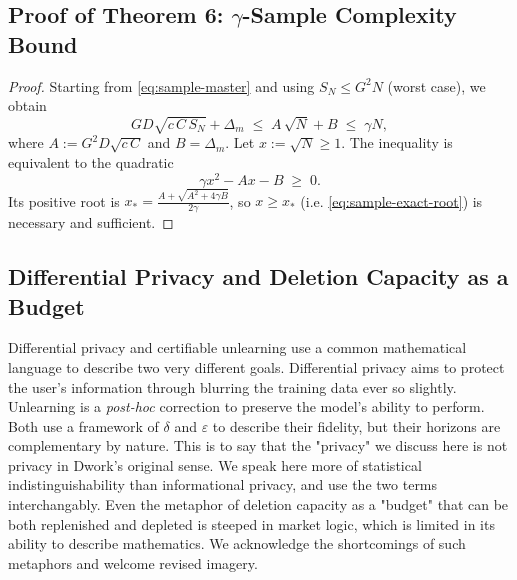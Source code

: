 \documentclass{article}
\theoremstyle{ssltheorem}
\begin{document}
\subsection{Proof of Theorem 6: $\gamma$-Sample Complexity Bound}
\begin{proof}
Starting from \eqref{eq:sample-master} and using $S_{N}\le G^{2}N$ (worst case), we obtain
$$
GD\sqrt{c\,C\,S_{N}}+\Delta_m
\;\le\;
A\,\sqrt{N}+B
\;\le\;\gamma N,
$$
where $A:=G^{2}D\sqrt{c\,C}$ and $B=\Delta_{m}$.
Let $x:=\sqrt{N}\ge 1$. The inequality is equivalent to the quadratic
$$
\gamma x^{2} - A x - B \;\ge\;
0.
$$
Its positive root is $x_{*}=\frac{A+\sqrt{A^{2}+4\gamma B}}{2\gamma}$, so $x\ge x_{*}$ (i.e. \eqref{eq:sample-exact-root})
is necessary and sufficient.
\end{proof}

\subsection{Differential Privacy and Deletion Capacity as a Budget}
Differential privacy and certifiable unlearning use a common mathematical language to describe two very different goals.
Differential privacy aims to protect the user's information through blurring the training data ever so slightly.
Unlearning is a \textit{post-hoc} correction to preserve the model's ability to perform.
Both use a framework of $\delta$ and $\varepsilon$ to describe their fidelity, but their horizons are complementary by nature.
This is to say that the "privacy" we discuss here is not privacy in Dwork's original sense.
We speak here more of statistical indistinguishability than informational privacy, and use the two terms interchangably.
Even the metaphor of deletion capacity as a "budget" that can be both replenished and depleted is steeped in market logic, which is limited in its ability to describe mathematics.
We acknowledge the shortcomings of such metaphors and welcome revised imagery. 



\end{document}
